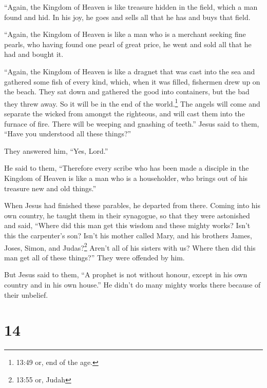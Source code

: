 ``Again, the Kingdom of Heaven is like treasure hidden in
the field, which a man found and hid. In his joy, he goes and sells all
that he has and buys that field.

 ``Again, the Kingdom of Heaven is like a man who is a
merchant seeking fine pearls,  who having found one pearl
of great price, he went and sold all that he had and bought it.

 ``Again, the Kingdom of Heaven is like a dragnet that was
cast into the sea and gathered some fish of every kind, 
which, when it was filled, fishermen drew up on the beach. They sat down
and gathered the good into containers, but the bad they threw away.
 So it will be in the end of the world.\footnote{13:49 or,
  end of the age.} The angels will come and separate the wicked from
amongst the righteous,  and will cast them into the furnace
of fire. There will be weeping and gnashing of teeth.'' 
Jesus said to them, ``Have you understood all these things?''

They answered him, ``Yes, Lord.''

 He said to them, ``Therefore every scribe who has been
made a disciple in the Kingdom of Heaven is like a man who is a
householder, who brings out of his treasure new and old things.''

 When Jesus had finished these parables, he departed from
there.  Coming into his own country, he taught them in
their synagogue, so that they were astonished and said, ``Where did this
man get this wisdom and these mighty works?  Isn't this the
carpenter's son? Isn't his mother called Mary, and his brothers James,
Joses, Simon, and Judas?\footnote{13:55 or, Judah}  Aren't
all of his sisters with us? Where then did this man get all of these
things?''  They were offended by him.

But Jesus said to them, ``A prophet is not without honour, except in his
own country and in his own house.''  He didn't do many
mighty works there because of their unbelief.

\hypertarget{section-13}{%
\section{14}\label{section-13}}

